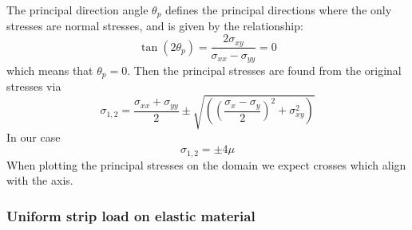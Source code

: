 The principal direction angle $\theta_p$ defines the principal
directions where the only stresses are normal stresses, and 
is given by the relationship:
\[
\tan (2\theta_p) =  \frac{2 \sigma_{xy}}{\sigma_{xx} -\sigma_{yy}} = 0
\]
which means that $\theta_p = 0$.
Then the principal stresses are found from the original stresses via
\[
\sigma_{1,2}=\frac{\sigma_{xx}+\sigma_{yy}}{2} \pm \sqrt{  \left( \left(\frac{\sigma_x-\sigma_y}{2}\right)^2 +\sigma_{xy}^2  \right)}
\]
In our case 
\[
\sigma_{1,2} = \pm 4 \mu 
\]
When plotting the principal stresses on the domain we expect crosses which align with the axis. 






\subsubsection{Uniform strip load on elastic material} \label{sec:elaststripload}



